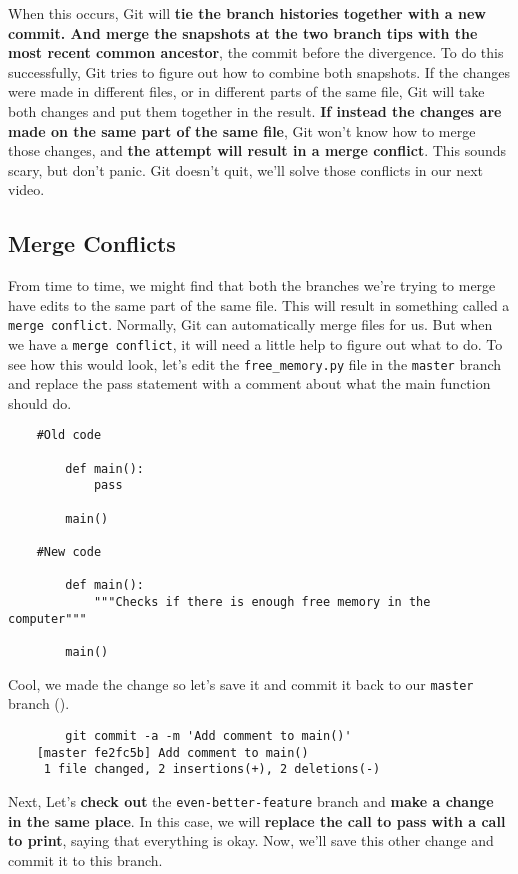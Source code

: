	When this occurs, Git will\textbf{ tie the branch histories together with a new commit. And merge the snapshots at the two branch tips with the most recent common ancestor}, the commit before the divergence. To do this successfully, Git tries to figure out how to combine both snapshots. If the changes were made in different files, or in different parts of the same file, Git will take both changes and put them together in the result. \textbf{If instead the changes are made on the same part of the same file}, Git won't know how to merge those changes, and \textbf{the attempt will result in a merge conflict}. This sounds scary, but don't panic. Git doesn't quit, we'll solve those conflicts in our next video.
	
	\subsection{Merge Conflicts}
	
	From time to time, we might find that both the branches we're trying to merge have edits to the same part of the same file. This will result in something called a \texttt{merge conflict}. Normally, Git can automatically merge files for us. But when we have a \texttt{merge conflict}, it will need a little help to figure out what to do. To see how this would look, let's edit the \verb|free_memory.py| file in the \texttt{master} branch and replace the pass statement with a comment about what the main function should do.
	
	\begin{verbatim}
	#Old code
		
		def main():
			pass
		
		main()
		
	#New code
		
		def main():
			"""Checks if there is enough free memory in the computer"""
		
		main()		
	\end{verbatim}
		
	
	Cool, we made the change so let's save it and commit it back to our \texttt{master} branch ().
	
	\begin{verbatim}
		git commit -a -m 'Add comment to main()'
	[master fe2fc5b] Add comment to main()
	 1 file changed, 2 insertions(+), 2 deletions(-)		
	\end{verbatim}
	
	Next, Let's \textbf{check out} the \verb|even-better-feature| branch and \textbf{make a change in the same place}. In this case, we will \textbf{replace the call to pass with a call to print}, saying that everything is okay.	Now, we'll save this other change and commit it to this branch.
	
